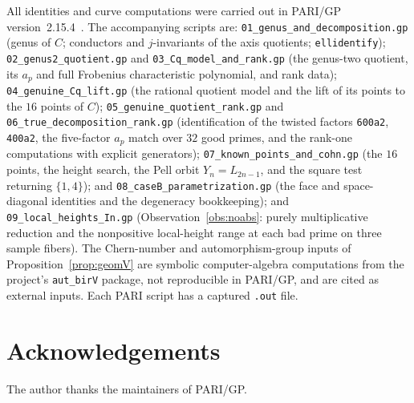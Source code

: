 \documentclass[11pt,reqno]{amsart}
\theoremstyle{plain}
\theoremstyle{definition}
\begin{document}
All identities and curve computations were carried out in PARI/GP
version~2.15.4~\cite{pari}. The accompanying scripts are:
\texttt{01\_genus\_and\_decomposition.gp} (genus of $C$; conductors and
$j$-invariants of the axis quotients; \texttt{ellidentify});
\texttt{02\_genus2\_quotient.gp} and \texttt{03\_Cq\_model\_and\_rank.gp}
(the genus-two quotient, its $a_p$ and full Frobenius characteristic polynomial,
and rank data);
\texttt{04\_genuine\_Cq\_lift.gp} (the rational quotient model and the lift of
its points to the $16$ points of $C$);
\texttt{05\_genuine\_quotient\_rank.gp} and
\texttt{06\_true\_decomposition\_rank.gp} (identification of the twisted factors
\texttt{600a2}, \texttt{400a2}, the five-factor $a_p$ match over $32$ good
primes, and the rank-one computations with explicit generators);
\texttt{07\_known\_points\_and\_cohn.gp} (the $16$ points, the height search,
the Pell orbit $Y_n=L_{2n-1}$, and the square test returning $\{1,4\}$); and
\texttt{08\_caseB\_parametrization.gp} (the face and space-diagonal identities
and the degeneracy bookkeeping); and
\texttt{09\_local\_heights\_In.gp} (Observation~\ref{obs:noabs}: purely
multiplicative reduction and the nonpositive local-height range at each bad prime
on three sample fibers). The Chern-number and automorphism-group inputs of
Proposition~\ref{prop:geomV} are symbolic computer-algebra computations from the
project's \texttt{aut\_birV} package, not reproducible in PARI/GP, and are cited
as external inputs. Each PARI script has a captured \texttt{.out} file.

\section*{Acknowledgements}
The author thanks the maintainers of PARI/GP.
\end{document}
